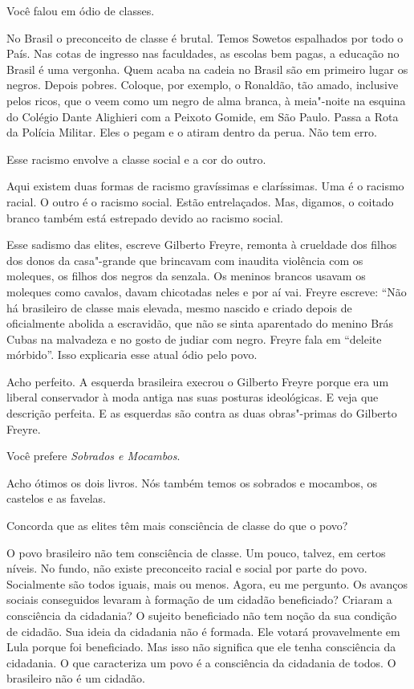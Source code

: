 \falaG Você falou em ódio de classes.

\falaM No Brasil o preconceito de classe é brutal. Temos Sowetos espalhados
por todo o País. Nas cotas de ingresso nas faculdades, as escolas bem
pagas, a educação no Brasil é uma vergonha. Quem acaba na cadeia no
Brasil são em primeiro lugar os negros. Depois pobres. Coloque, por
exemplo, o Ronaldão, tão amado, inclusive pelos ricos, que o veem como
um negro de alma branca, à meia"-noite na esquina do Colégio Dante
Alighieri com a Peixoto Gomide, em São Paulo. Passa a Rota da Polícia
Militar. Eles o pegam e o atiram dentro da perua. Não tem erro.

\falaG Esse racismo envolve a classe social e a cor do outro.

\falaM Aqui existem duas formas de racismo gravíssimas e claríssimas. Uma é
o racismo racial. O outro é o racismo social. Estão entrelaçados. Mas,
digamos, o coitado branco também está estrepado devido ao racismo
social.

\falaG Esse sadismo das elites, escreve Gilberto Freyre, remonta à crueldade
dos filhos dos donos da casa"-grande que brincavam com inaudita violência
com os moleques, os filhos dos negros da senzala. Os meninos brancos
usavam os moleques como cavalos, davam chicotadas neles e por aí vai.
Freyre escreve: ``Não há brasileiro de classe mais elevada, mesmo
nascido e criado depois de oficialmente abolida a escravidão, que não se
sinta aparentado do menino Brás Cubas na malvadeza e no gosto de judiar
com negro. Freyre fala em ``deleite mórbido''. Isso explicaria esse
atual ódio pelo povo.

\falaM Acho perfeito. A esquerda brasileira execrou o Gilberto Freyre porque
era um liberal conservador à moda antiga nas suas posturas ideológicas.
E veja que descrição perfeita. E as esquerdas são contra as duas
obras"-primas do Gilberto Freyre.

\falaG Você prefere \emph{Sobrados e Mocambos}.

\falaM Acho ótimos os dois livros. Nós também temos os sobrados e mocambos,
os castelos e as favelas.

\falaG Concorda que as elites têm mais consciência de classe do que o povo?

\falaM O povo brasileiro não tem consciência de classe. Um pouco, talvez, em
certos níveis. No fundo, não existe preconceito racial e social por
parte do povo. Socialmente são todos iguais, mais ou menos. Agora, eu me
pergunto. Os avanços sociais conseguidos levaram à formação de um
cidadão beneficiado? Criaram a consciência da cidadania? O sujeito
beneficiado não tem noção da sua condição de cidadão. Sua ideia da
cidadania não é formada. Ele votará provavelmente em Lula porque foi
beneficiado. Mas isso não significa que ele tenha consciência da
cidadania. O que caracteriza um povo é a consciência da cidadania de
todos. O brasileiro não é um cidadão.

